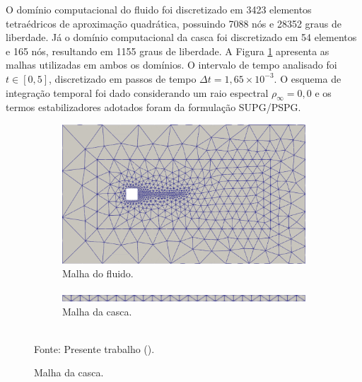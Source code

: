 
O domínio computacional do fluido foi discretizado em 3423 elementos tetraédricos de aproximação quadrática, possuindo 7088 nós e 28352 graus de liberdade. Já o domínio computacional da casca foi discretizado em 54 elementos e 165 nós, resultando em 1155 graus de liberdade. A Figura \ref{fig:meshPanel} apresenta as malhas utilizadas em ambos os domínios. O intervalo de tempo analisado foi $t\in[0,5]$, discretizado em passos de tempo $\Delta t=1,65\times10^{-3}$. O esquema de integração temporal foi dado considerando um raio espectral $\rho_\infty=0,0$ e os termos estabilizadores adotados foram da formulação SUPG/PSPG.

\begin{figure}[h!]
    \centering
    \caption{\textit{Flutter} em painel - Malha utilizada para os domínios da simulação de painel.}
    \begin{subfigure}[b]{\textwidth}
        \centering
        \includegraphics[width=.8\linewidth]{Figuras/FSI-prism/meshFluid.png}
        \caption{Malha do fluido.}
    \end{subfigure}
    \begin{subfigure}[b]{\textwidth}
        \centering
        \includegraphics[width=.8\linewidth]{Figuras/FSI-prism/meshSolid.png}
        \caption{Malha da casca.}
    \end{subfigure}
    \\Fonte: Presente trabalho (\the\year).
    \label{fig:meshPanel}
\end{figure}

